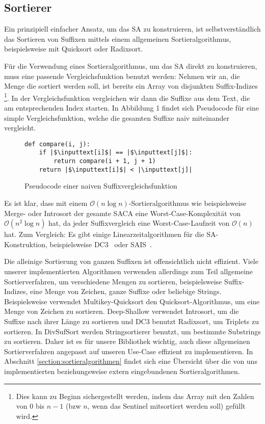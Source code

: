 \subsection{Sortierer}
Ein  prinzipiell einfacher Ansatz, um das SA zu konstruieren,
ist selbstverständlich das Sortieren von Suffixen mittels einem allgemeinen Sortieralgorithmus,
beispielsweise mit Quicksort oder Radixsort.

Für die Verwendung eines Sortieralgorithmus, um das SA direkt zu konstruieren,
muss eine passende Vergleichsfunktion benutzt werden:
Nehmen wir an, die Menge die sortiert werden soll, ist bereits ein Array von disjunkten Suffix-Indizes
\footnote{Dies kann zu Beginn sichergestellt werden, indem das
Array mit den Zahlen von 0 bis $n-1$ (bzw $n$, wenn das Sentinel mitsortiert werden soll) gefüllt wird.}.
In der Vergleichsfunktion vergleichen wir dann die Suffixe aus dem Text, die am entsprechenden Index starten.
In Abbildung 1 findet sich Pseudocode für eine simple Vergleichsfunktion,
welche die gesamten Suffixe naiv miteinander vergleicht.

\begin{figure}[!h]
\begin{verbatim}
def compare(i, j):
    if |$\inputtext[i]$| == |$\inputtext[j]$|:
        return compare(i + 1, j + 1)
    return |$\inputtext[i]$| < |\inputtext[j]|
\end{verbatim}
\caption{Pseudocode einer naiven Suffixvergleichsfunktion}
\end{figure}
%
Es ist klar, dass mit einem $\mathcal O(n \log n)$-Sortieralgorithmus wie beispielsweise Merge- oder Introsort
der gesamte SACA eine Worst-Case-Komplexität von\\ $\mathcal O(n^2 \log n)$ hat, da jeder Suffixvergleich
eine Worst-Case-Laufzeit von $\mathcal O(n)$ hat.
Zum Vergleich: Es gibt einige Linearzeitalgorithmen für die SA-Konstruktion, beispielsweise DC3~\cite{saca:9} oder SAIS~\cite{saca:6}.

Die alleinige Sortierung von ganzen Suffixen ist offensichtlich nicht effizient.
Viele unserer implementierten Algorithmen verwenden allerdings zum Teil allgemeine Sortierverfahren,
um verschiedene Mengen zu sortieren,
beispielsweise Suffix-Indizes, eine Menge von Zeichen, ganze Suffixe oder beliebige Strings.
Beispielsweise verwendet Multikey-Quicksort den Quicksort-Algorithmus, um eine Menge von Zeichen zu sortieren.
Deep-Shallow verwendet Introsort, um die Suffixe nach ihrer Länge zu sortieren
und DC3 benutzt Radixsort, um Triplets zu sortieren.
In DivSufSort werden Stringsortierer benutzt, um bestimmte Substrings zu sortieren.
Daher ist es für unsere Bibliothek wichtig, auch diese allgemeinen Sortierverfahren angepasst
auf unseren Use-Case effizient zu implementieren.
In Abschnitt \ref{section:sortieralgorithmen} findet sich eine Übersicht über die von uns
implementierten beziehungsweise extern eingebundenen Sortieralgorithmen.
